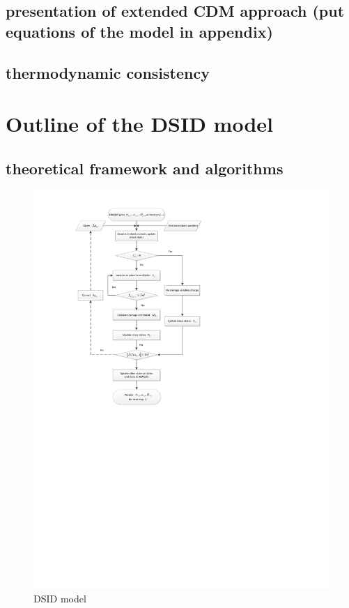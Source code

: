 \documentclass[preprint,review,12pt]{elsarticle}
\begin{document}
\subsection{presentation of extended CDM approach (put equations of the model in appendix)}

\subsection{thermodynamic consistency} 

\section{Outline of the DSID model}
\subsection{theoretical framework and algorithms} 
\begin{figure}[htbp]
\begin{center}
\includegraphics[width=\textwidth]{flowchart2.pdf}
\caption{DSID model}
\label{fig:energy}
\end{center}
\end{figure}
\end{document}
